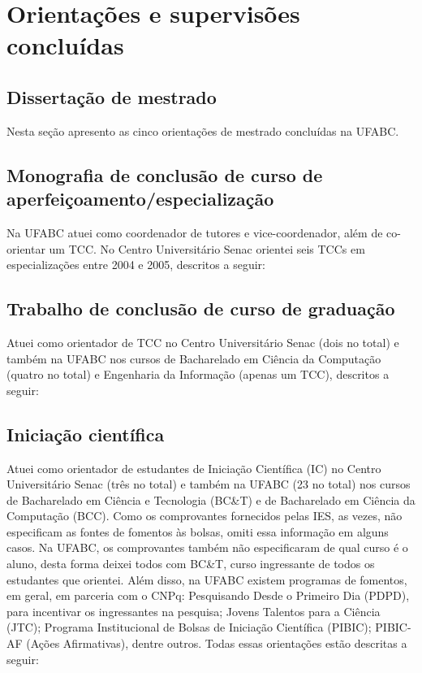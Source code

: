 

\section{Orientações e supervisões concluídas}

\subsection{Dissertação de mestrado}

Nesta seção apresento as cinco orientações de mestrado concluídas na UFABC.



\subsection{Monografia de conclusão de curso de aperfeiçoamento/especialização}

Na UFABC atuei como coordenador de tutores e vice-coordenador, além de co-orientar um TCC. No Centro Universitário Senac orientei seis TCCs em especializações entre 2004 e 2005, descritos a seguir:



\subsection{Trabalho de conclusão de curso de graduação}

Atuei como orientador de TCC no Centro Universitário Senac (dois no total) e também na UFABC nos cursos de Bacharelado em Ciência da Computação (quatro no total) e Engenharia da Informação (apenas um TCC), descritos a seguir:



\subsection{Iniciação científica}

Atuei como orientador de estudantes de Iniciação Científica (IC) no Centro Universitário Senac (três no total) e também na UFABC (23 no total) nos cursos de Bacharelado em Ciência e Tecnologia (BC\&T) e de Bacharelado em Ciência da Computação (BCC). Como os comprovantes fornecidos pelas IES, as vezes, não especificam as fontes de fomentos às bolsas, omiti essa informação em alguns casos. Na UFABC, os comprovantes também não especificaram de qual curso é o aluno, desta forma deixei todos com BC\&T, curso ingressante de todos os estudantes que orientei. Além disso, na UFABC existem programas de fomentos, em geral, em parceria com o CNPq: Pesquisando Desde o Primeiro Dia (PDPD), para incentivar os ingressantes na pesquisa; Jovens Talentos para a Ciência (JTC); Programa Institucional de Bolsas de Iniciação Científica (PIBIC); PIBIC-AF (Ações Afirmativas), dentre outros. Todas essas orientações estão descritas a seguir:

